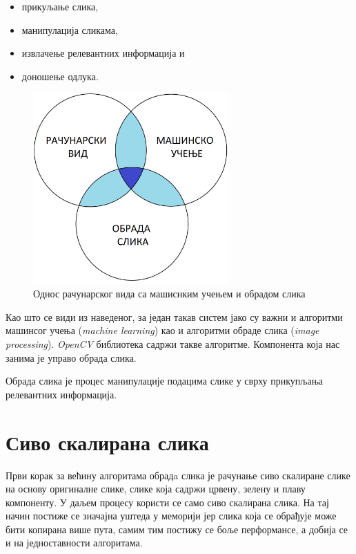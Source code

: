 \documentclass[12pt,a4paper,serbian,oneside]{book}
\begin{document}
\begin{itemize} \itemsep1pt \parskip0pt 
  \item прикуљање слика,
  \item манипулација сликама,
  \item извлачење релевантних информација и
  \item доношење одлука.
\end{itemize}

\begin{figure}[h]
\begin{center}
\includegraphics[width=75mm]{images/cv.png}
\end{center}
\caption{Однос рачунарског вида са машиснким учењем и обрадом слика}
\label{fig:cv}
\end{figure}

Као што се види из наведеног, за један такав систем јако су важни и алгоритми машинсог учења (\textit{machine learning}) као и алгоритми обраде слика (\textit{image processing}). \textit{OpenCV} библиотека садржи такве алгоритме. Компонента која нас занима је управо обрада слика.

Обрада слика је процес манипулације подацима слике у сврху прикупљања релевантних информација.

\section{Сиво скалирана слика}

Први корак за већину алгоритама обрадa слика је рачунање сиво скалиране слике на основу оригиналне слике, слике која садржи црвену, зелену и плаву компоненту. У даљем процесу користи се само сиво скалирана слика. На тај начин  постиже се значајна уштеда у меморији јер слика која се обрађује може бити копирана више пута, самим тим постижу се боље перформансе,  а добија се и на једноставности алгоритама.
\end{document}
